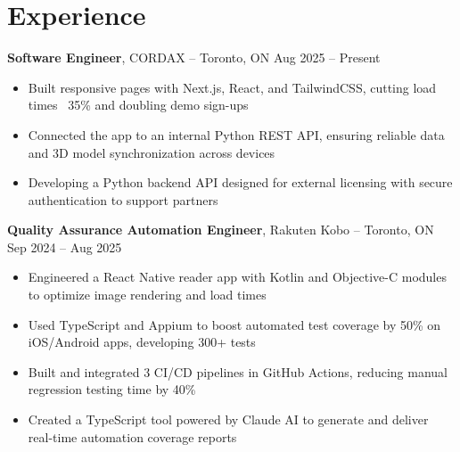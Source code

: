

\section*{Experience}
\textbf{Software Engineer}, {CORDAX} -- Toronto, ON \hfill Aug 2025 -- Present \\
\vspace{-5pt}
\begin{itemize}
  \item Built responsive pages with Next.js, React, and TailwindCSS, cutting load times ~35\% and doubling demo sign-ups
  \item Connected the app to an internal Python REST API, ensuring reliable data and 3D model synchronization across devices
  \item Developing a Python backend API designed for external licensing with secure authentication to support partners
\end{itemize}


\textbf{Quality Assurance Automation Engineer}, {Rakuten Kobo} -- Toronto, ON \hfill Sep 2024 -- Aug 2025 \\
\vspace{-5pt}
\begin{itemize}
  \item Engineered a React Native reader app with Kotlin and Objective-C modules to optimize image rendering and load times
  \item Used TypeScript and Appium to boost automated test coverage by 50\% on iOS/Android apps, developing 300+ tests
  \item Built and integrated 3 CI/CD pipelines in GitHub Actions, reducing manual regression testing time by 40\%
  \item Created a TypeScript tool powered by Claude AI to generate and deliver real-time automation coverage reports
\end{itemize}

